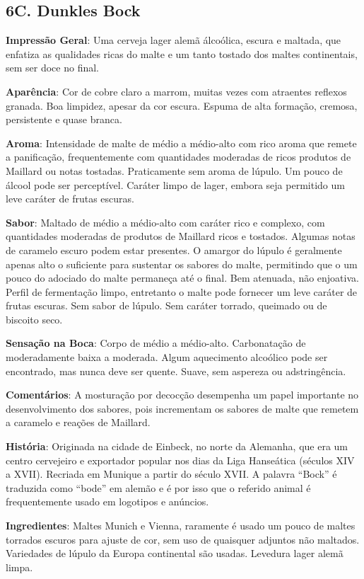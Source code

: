 \subsection*{6C. Dunkles Bock}
\textbf{Impressão Geral}: Uma cerveja lager alemã álcoólica, escura e maltada, que enfatiza as qualidades ricas do malte e um tanto tostado dos maltes continentais, sem ser doce no final.

\textbf{Aparência}: Cor de cobre claro a marrom, muitas vezes com atraentes reflexos granada. Boa limpidez, apesar da cor escura. Espuma de alta formação, cremosa, persistente e quase branca.

\textbf{Aroma}: Intensidade de malte de médio a médio-alto com rico aroma que remete a panificação, frequentemente com quantidades moderadas de ricos produtos de Maillard ou notas tostadas. Praticamente sem aroma de lúpulo. Um pouco de álcool pode ser perceptível. Caráter limpo de lager, embora seja permitido um leve caráter de frutas escuras.

\textbf{Sabor}: Maltado de médio a médio-alto com caráter rico e complexo, com quantidades moderadas de produtos de Maillard ricos e tostados. Algumas notas de caramelo escuro podem estar presentes. O amargor do lúpulo é geralmente apenas alto o suficiente para sustentar os sabores do malte, permitindo que o um pouco do adociado do malte permaneça até o final. Bem atenuada, não enjoativa. Perfil de fermentação limpo, entretanto o malte pode fornecer um leve caráter de frutas escuras. Sem sabor de lúpulo. Sem caráter torrado, queimado ou de biscoito seco.

\textbf{Sensação na Boca}: Corpo de médio a médio-alto. Carbonatação de moderadamente baixa a moderada. Algum aquecimento alcoólico pode ser encontrado, mas nunca deve ser quente. Suave, sem aspereza ou adstringência.

\textbf{Comentários}: A mosturação por decocção desempenha um papel importante no desenvolvimento dos sabores, pois incrementam os sabores de malte que remetem a caramelo e reações de Maillard.

\textbf{História}: Originada na cidade de Einbeck, no norte da Alemanha, que era um centro cervejeiro e exportador popular nos dias da Liga Hanseática (séculos XIV a XVII). Recriada em Munique a partir do século XVII. A palavra “Bock” é traduzida como “bode” em alemão e é por isso que o referido animal é frequentemente usado em logotipos e anúncios.

\textbf{Ingredientes}: Maltes Munich e Vienna, raramente é usado um pouco de maltes torrados escuros para ajuste de cor, sem uso de quaisquer adjuntos não maltados. Variedades de lúpulo da Europa continental são usadas. Levedura lager alemã limpa.

